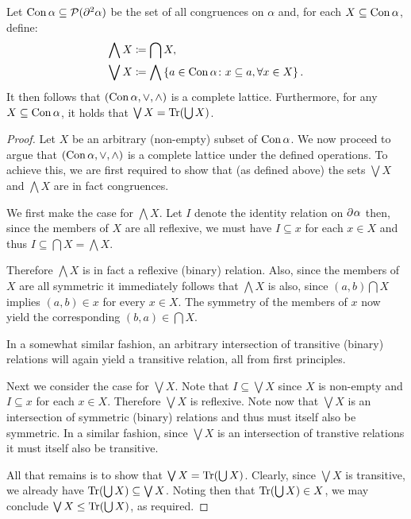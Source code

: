 \begin{prp}
	\label{prp:conlat}
	Let $\operatorname{Con} \alpha\subseteq\mathcal{P}(\partial^{2}\alpha)$ be the set of all
	congruences on $\alpha$ and, for each $X\subseteq \operatorname{Con}\alpha$, define:
	\begin{align}
		\bigwedge X &\coloneqq\bigcap X,\\ \bigvee X
					&\coloneqq\bigwedge\left\lbrace a\in\operatorname{Con}\alpha\colon x\subseteq
					a,\forall x\in X \right\rbrace.
	\end{align}
	It then follows that $(\operatorname{Con}\alpha,\vee,\wedge)$ is a complete lattice.
	Furthermore, for any $X\subseteq\operatorname{Con}\alpha$, it holds that $\bigvee
	X=\operatorname{Tr}(\bigcup X)$.
\end{prp}
\begin{proof}
	Let $X$ be an arbitrary (non-empty) subset of $\operatorname{Con}\alpha$.  We now proceed
	to argue that $(\operatorname{Con}\alpha,\vee,\wedge)$ is a complete lattice under the
	defined operations.  To achieve this, we are first required to show that (as
	defined above) the sets $\bigvee X$ and $\bigwedge X$ are in fact
	congruences.

	We first make the case for $\bigwedge X$.  Let $I$ denote the identity
	relation on $\partial^{}\alpha$ then, since the members of $X$ are all
	reflexive, we must have $I\subseteq x$ for each $x\in X$ and thus
	$I\subseteq\bigcap X=\bigwedge X$.

	Therefore $\bigwedge X$ is in fact a reflexive (binary) relation.  Also,
	since the members of $X$ are all symmetric it immediately follows that
	$\bigwedge X$ is also, since $(a,b)\bigcap X$ implies $(a,b)\in x$ for every
	$x\in X$.  The symmetry of the members of $x$ now yield the
	corresponding $(b,a)\in\bigcap X$.

	In a somewhat similar fashion, an arbitrary intersection of transitive
	(binary) relations will again yield a transitive relation, all from first
	principles.

	Next we consider the case for $\bigvee X$.  Note that $I\subseteq \bigvee X$
	since $X$ is non-empty and $I\subseteq x$ for each $x\in X$.  Therefore
	$\bigvee X$ is reflexive.  Note now that $\bigvee X$ is an intersection of
	symmetric (binary) relations and thus must itself also be symmetric.  In a
	similar fashion, since $\bigvee X$ is an intersection of transtive relations
	it must itself also be transitive.

	All that remains is to show that $\bigvee X=\operatorname{Tr}(\bigcup X)$.  Clearly,
	since $\bigvee X$ is transitive, we already have $\operatorname{Tr}(\bigcup
	X)\subseteq\bigvee X$.  Noting then that $\operatorname{Tr}(\bigcup X)\in X$, we may
	conclude $\bigvee X\leq\operatorname{Tr}(\bigcup X)$, as required.
\end{proof}

